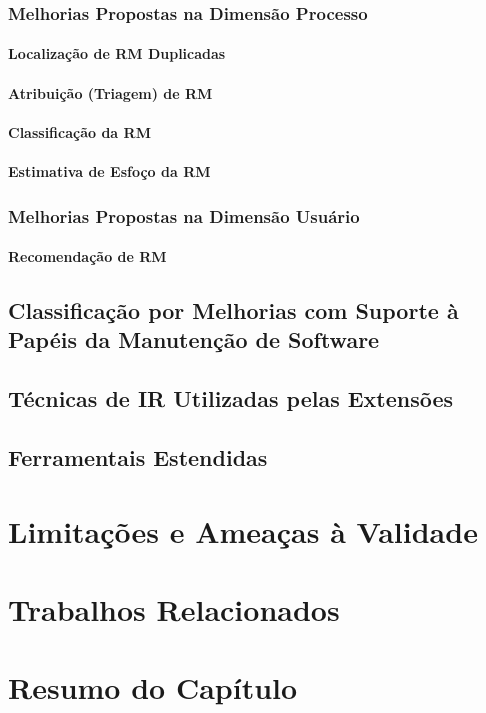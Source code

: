 \subsubsection{Melhorias Propostas na Dimensão Processo}
\label{ssub:melhorias_dim_processo}

\paragraph{Localização de RM Duplicadas}

\paragraph{Atribuição (Triagem) de RM}

\paragraph{Classificação da RM}

\paragraph{Estimativa de Esfoço da RM}

\subsubsection{Melhorias Propostas na Dimensão Usuário}
\label{ssub:melhorias_dim_usuario}

\paragraph{Recomendação de RM}

\subsection{Classificação por Melhorias com Suporte à Papéis da Manutenção de
	Software}
\label{sub:extensões_com_suporte_a_papeis}

\subsection{Técnicas de IR Utilizadas pelas Extensões}
\label{sub:técnicas_de_ir_utilizadaas_pelas_extensões}


\subsection{Ferramentais Estendidas}
\label{sub:ferrramentas_extendidas}


\section{Limitações e Ameaças à Validade}

\section{Trabalhos Relacionados}

\section{Resumo do Capítulo}
